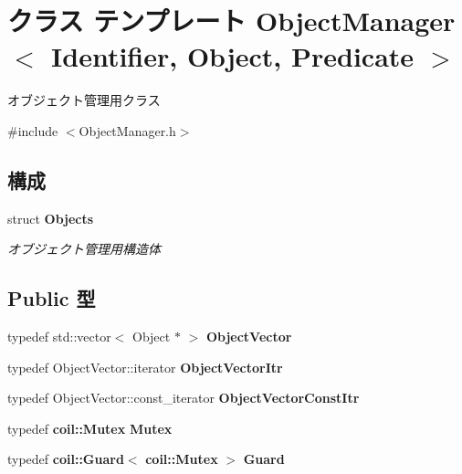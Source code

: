\section{クラス テンプレート ObjectManager$<$ Identifier, Object, Predicate $>$}
\label{classObjectManager}


オブジェクト管理用クラス  




{\ttfamily \#include $<$ObjectManager.h$>$}

\subsection*{構成}
\begin{DoxyCompactItemize}
\item 
struct {\bf Objects}
\begin{DoxyCompactList}\small\item\em オブジェクト管理用構造体 \item\end{DoxyCompactList}\end{DoxyCompactItemize}
\subsection*{Public 型}
\begin{DoxyCompactItemize}
\item 
typedef std::vector$<$ Object $\ast$ $>$ {\bf ObjectVector}
\item 
typedef ObjectVector::iterator {\bf ObjectVectorItr}
\item 
typedef ObjectVector::const\_\-iterator {\bf ObjectVectorConstItr}
\item 
typedef {\bf coil::Mutex} {\bf Mutex}
\item 
typedef {\bf coil::Guard}$<$ {\bf coil::Mutex} $>$ {\bf Guard}
\end{DoxyCompactItemize}
